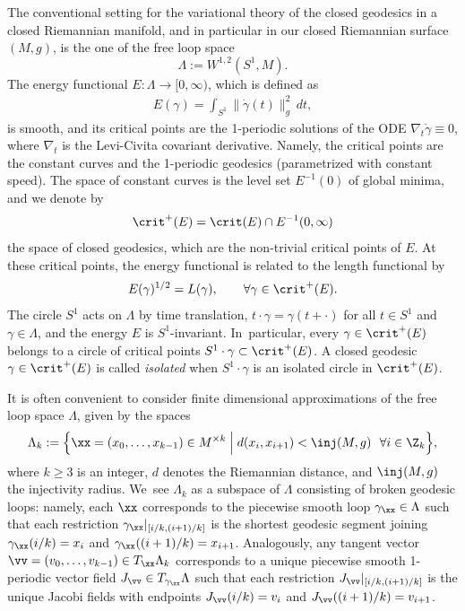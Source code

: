 The conventional setting for the variational theory of the closed geodesics in a closed Riemannian manifold, and in particular in our closed Riemannian surface $(M,g)$, is the one of the free loop space \[
\Lambda:=W^{1,2}(S^1,M).
\] The energy functional $E:\Lambda\to[0,\infty)$, which is defined as
\begin{align*}
E(\gamma)=\int_{S^1} \|\dot\gamma(t)\|_g^2\,dt,
\end{align*}
is smooth, and its critical points are the 1-periodic solutions of the ODE $\nabla_t\dot\gamma\equiv0$, where $\nabla_t$ is the Levi-Civita covariant derivative. Namely, the critical points are the constant curves and the 1-periodic geodesics (parametrized with constant speed).
The space of constant curves is the level set $E^{-1}(0)$ of global minima, and we denote by \[
\crit^+(E)=\crit(E)\cap E^{-1}(0,\infty)
\] the space of closed geodesics, which are the non-trivial critical points of $E$.
At these critical points, the energy functional is related to the length functional by
\begin{align*}
E(\gamma)^{1/2}=L(\gamma),\qquad\forall \gamma\in\crit^+(E).
\end{align*}
The circle $S^1$ acts on $\Lambda$ by time translation, \ie $t\cdot\gamma=\gamma(t+\cdot)$ for all $t\in S^1$ and $\gamma\in\Lambda$, and the energy $E$ is $S^1$-invariant. In~particular, every $\gamma\in\crit^+(E)$ belongs to a circle of critical points $S^1\cdot\gamma\subset\crit^+(E)$. A closed geodesic $\gamma\in\crit^+(E)$ is called \emph{isolated} when $S^1\cdot\gamma$ is an isolated circle in $\crit^+(E)$.

It is often convenient to consider finite dimensional approximations of the free loop space $\Lambda$, given by the spaces
\begin{align*}
\Lambda_k:=\Big\{ \xx=(x_0,\dots,x_{k-1})\in M^{\times k}\Bigm|d(x_i,x_{i+1})<\inj(M,g)\ \ \forall i\in\Z_k \Big\},
\end{align*}
where $k\geq 3$ is an integer, $d$ denotes the Riemannian distance, and $\inj(M,g)$ the injectivity radius. We~see $\Lambda_k$ as a subspace of $\Lambda$ consisting of broken geodesic loops: namely, each $\xx$ corresponds to the piecewise smooth loop $\gamma_{\xx}\in\Lambda$ such that each restriction $\gamma_{\xx}|_{[i/k,(i+1)/k]}$ is the shortest geodesic segment joining $\gamma_{\xx}(i/k)=x_i$ and $\gamma_{\xx}((i+1)/k)=x_{i+1}$. Analogously, any tangent vector $\vv=(v_0,\dots,v_{k-1})\in T_{\xx}\Lambda_k$ corresponds to a unique piecewise smooth 1-periodic vector field $J_{\vv}\in T_{\gamma_{\xx}}\Lambda$ such that each restriction $J_{\vv}|_{[i/k,(i+1)/k]}$ is the unique Jacobi fields with endpoints $J_{\vv}(i/k)=v_i$ and $J_{\vv}((i+1)/k)=v_{i+1}$.

